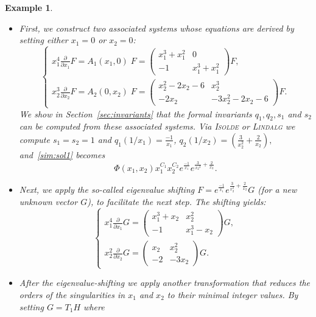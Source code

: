 \documentclass[final,1p,times,number,amsthm]{elsart}
\newtheorem{example}[lemma]{Example}
\newcommand{\pder}[2]{\frac{\partial}{\partial #2}#1}
\begin{document}
\begin{example}
  \begin{itemize}
  \item First, we construct two associated systems whose equations are derived
    by setting either $x_1=0$ or $x_2=0$:
    \[
    \begin{cases}
      x_1^{4} \pder{F}{x_1} = A_1 (x_1,0) \; F= \left(\begin{matrix}
          x_1^3+ x_1^2 & 0 \\
          -1 & x_1^3 + x_1^2
        \end{matrix}\right) F,\\
      x_2^3 \pder{F}{x_2} = A_2 (0, x_2) \; F= \left(\begin{matrix}
          x_2^2 -2 x_2 -6 & x_2^3 \\
          -2 x_2 & -3 x_2^2 -2 x_2 -6
        \end{matrix}\right)F.
    \end{cases}
    \]
    We show in Section~\ref{sec:invariants} that the formal invariants $q_1,
    q_2,s_1$ and $s_2$ can be computed from these associated systems. Via
    \textsc{Isolde} or \textsc{Lindalg} we compute $s_1=s_2=1$ and
    $q_1(1/x_1)=\frac{-1}{x_1}$, $q_2(1/x_2)=(\frac{3}{x_2^2} + \frac{2}{x_2} ),$
    and~\eqref{sim:sol1} becomes
    \[
    \Phi (x_1, x_2) x_1^{{C}_1} x_2^{C_2} e^{\frac{-1}{x_1}} e^{\frac{3}{{x_2}^2}
      + \frac{2}{x_2}}.
    \]
  \item Next, we apply the so-called eigenvalue shifting
    $F = e^{\frac{-1}{x_1}} e^{\frac{3}{x_2^2} + \frac{2}{x_2}} G$ (for a new
    unknown vector $G$), to facilitate the next step. The shifting
    yields:\goodbreak
    \[
    \begin{cases}
      x_1^{4} \pder{G}{x_1} =  \left(\begin{matrix}
          x_1^3+x_2 & x_2^2 \\
          -1 & x_1^3 -x_2
        \end{matrix}\right) G,  \\
      x_2^2 \pder{G}{x_2} =  \left(\begin{matrix}
          x_2  & x_2^2 \\
          -2 & -3 x_2
        \end{matrix}\right) G.
    \end{cases}
    \]
  \item After the eigenvalue-shifting we apply another transformation that
    reduces the orders of the singularities in $x_1$ and $x_2$ to their minimal
    integer values. By setting $G = T_1 H$ where

\end{itemize}
\end{example}
\end{document}
